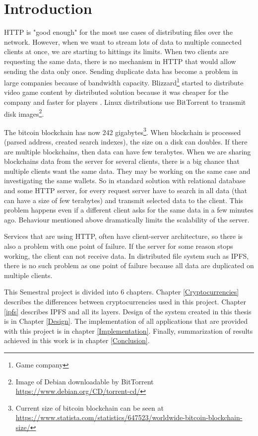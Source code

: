 \chapter{Introduction}


HTTP is "good enough" for the most use cases of distributing files over the network. However, when we want to stream lots of data to multiple connected clients at once, we are starting to hittings its limits. When two clients are requesting the same data, there is no mechanism in HTTP that would allow sending the data only once. Sending duplicate data has become a problem in large companies because of bandwidth capacity. Blizzard\footnote{Game company} started to distribute video game content by distributed solution because it was cheaper for the company and faster for players \cite{BigDataInVideoGames}. Linux distributions use BitTorrent to transmit disk images\footnote{Image of Debian downloadable by BitTorrent \url{https://www.debian.org/CD/torrent-cd/}}.

The bitcoin blockchain has now 242 gigabytes\footnote{Current size of bitcoin blockchain can be seen at \url{https://www.statista.com/statistics/647523/worldwide-bitcoin-blockchain-size/}}. When blockchain is processed (parsed address, created search indexes), the size on a disk can doubles. If there are multiple blockchains, then data can have few terabytes. When we are sharing blockchains data from the server for several clients, there is a big chance that multiple clients want the same data. They may be working on the same case and investigating the same wallets.  So in standard solution with relational database and some HTTP server, for every request server have to search in all data (that can have a size of few terabytes) and transmit selected data to the client. This problem happens even if a different client asks for the same data in a few minutes ago. Behaviour mentioned above dramatically limits the scalability of the server.

Services that are using HTTP, often have client-server architecture, so there is also a problem with one point of failure. If the server for some reason stops working, the client can not receive data. In distributed file system such as IPFS, there is no such problem as one point of failure because all data are duplicated on multiple clients.

This Semestral project is divided into 6 chapters. Chapter \ref{Cryptocurrencies} describes the differences between cryptocurrencies used in this project. Chapter \ref{ipfs} describes IPFS and all its layers. Design of the system created in this thesis is in Chapter \ref{Design}. The implementation of all applications that are provided with this project is in chapter \ref{Implementation}. Finally, summarization of results achieved in this work is in chapter \ref{Conclusion}.